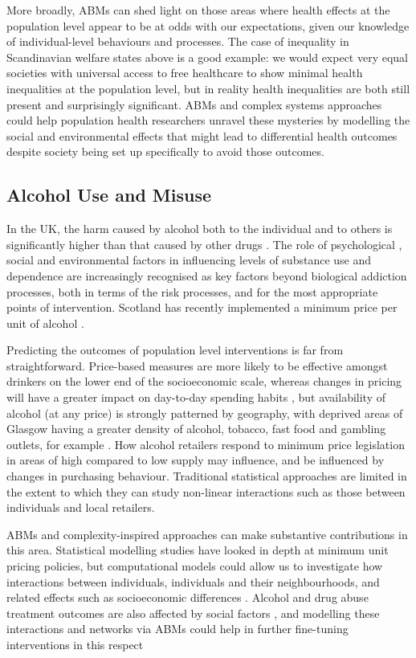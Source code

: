 \documentclass[review]{elsarticle}
\begin{document}
More broadly, ABMs can shed light on those areas where health effects at the population level appear to be at odds with our expectations, given our knowledge of individual-level behaviours and processes.  The case of inequality in Scandinavian welfare states above is a good example: we would expect very equal societies with universal access to free healthcare to show minimal health inequalities at the population level, but in reality health inequalities are both still present and surprisingly significant.  ABMs and complex systems approaches could help population health researchers unravel these mysteries by modelling the social and environmental effects that might lead to differential health outcomes despite society being set up specifically to avoid those outcomes.

\subsection{Alcohol Use and Misuse}

In the UK, the harm caused by alcohol both to the individual and to others is significantly higher than that caused by other drugs \citep{nutt2010}. The role of psychological \citep{hammersley2014}, social \citep{meier2018} and environmental factors \citep{birckmayer2004} in influencing levels of substance use and dependence are increasingly recognised as key factors beyond biological addiction processes, both in terms of the risk processes, and for the most appropriate points of intervention. Scotland has recently implemented a minimum price per unit of alcohol \citep{brennan2014}. 

Predicting the outcomes of population level interventions is far from straightforward. Price-based measures are more likely to be effective amongst drinkers on the lower end of the socioeconomic scale, whereas changes in pricing will have a greater impact on day-to-day spending habits \citep{holmes2014}, but availability of alcohol (at any price) is strongly patterned by geography, with deprived areas of Glasgow having a greater density of alcohol, tobacco, fast food and gambling outlets, for example \citep{macdonald2018}. How alcohol retailers respond to minimum price legislation in areas of high compared to low supply may influence, and be influenced by changes in purchasing behaviour. Traditional statistical approaches are limited in the extent to which they can study non-linear interactions such as those between individuals and local retailers.   

ABMs and complexity-inspired approaches can make substantive contributions in this area.  Statistical modelling studies have looked in depth at minimum unit pricing policies, but computational models could allow us to investigate how interactions between individuals, individuals and their neighbourhoods, and  related effects such as socioeconomic differences \citep{holmes2014}.  Alcohol and drug abuse treatment outcomes are also affected by social factors \citep{schroeder2001,homish2008}, and modelling these interactions and networks via ABMs could help in further fine-tuning interventions in this respect \citep{yorghos2018}
\end{document}
